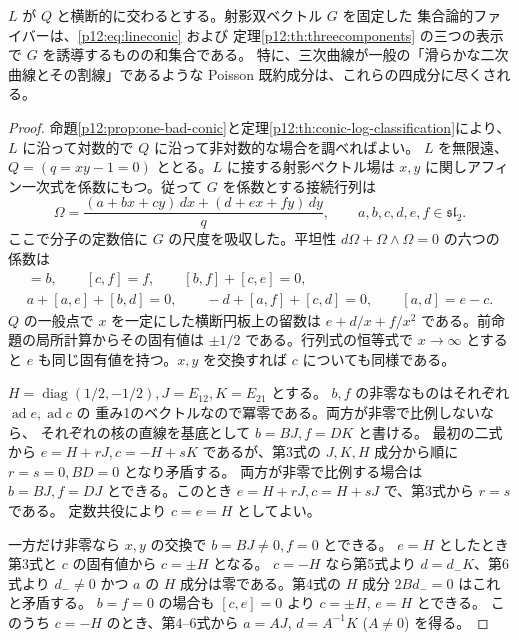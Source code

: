 \begin{theorem}\label{p12:th:secant-classification}
$L$ が $Q$ と横断的に交わるとする。射影双ベクトル $G$ を固定した
集合論的ファイバーは、\eqref{p12:eq:lineconic} および
定理\ref{p12:th:threecomponents} の三つの表示で $G$ を誘導するものの和集合である。
特に、三次曲線が一般の「滑らかな二次曲線とその割線」であるような
Poisson 既約成分は、これらの四成分に尽くされる。
\end{theorem}
\begin{proof}
命題\ref{p12:prop:one-bad-conic}と定理\ref{p12:th:conic-log-classification}により、
$L$ に沿って対数的で $Q$ に沿って非対数的な場合を調べればよい。
$L$ を無限遠、$Q=(q=xy-1=0)$ ととる。$L$ に接する射影ベクトル場は
$x,y$ に関しアフィン一次式を係数にもつ。従って $G$ を係数とする接続行列は
\[
 \Omega=\frac{(a+bx+cy)\,dx+(d+ex+fy)\,dy}{q},
 \qquad a,b,c,d,e,f\in\mathfrak{sl}_2.
\]
ここで分子の定数倍に $G$ の尺度を吸収した。平坦性
$d\Omega+\Omega\wedge\Omega=0$ の六つの係数は
\begin{align*}
 [e,b]=b,\qquad [c,f]=f,\qquad [b,f]+[c,e]=0,\\
 a+[a,e]+[b,d]=0,\qquad -d+[a,f]+[c,d]=0,\qquad [a,d]=e-c .
\end{align*}
$Q$ の一般点で $x$ を一定にした横断円板上の留数は
$e+d/x+f/x^2$ である。前命題の局所計算からその固有値は
$\pm1/2$ である。行列式の恒等式で $x\to\infty$ とすると
$e$ も同じ固有値を持つ。$x,y$ を交換すれば $c$ についても同様である。

$H=\operatorname{diag}(1/2,-1/2), J=E_{12}, K=E_{21}$ とする。
$b,f$ の非零なものはそれぞれ $\operatorname{ad}e,\operatorname{ad}c$ の
重み1のベクトルなので冪零である。両方が非零で比例しないなら、
それぞれの核の直線を基底として $b=BJ,f=DK$ と書ける。
最初の二式から $e=H+rJ,c=-H+sK$ であるが、第3式の
$J,K,H$ 成分から順に $r=s=0,BD=0$ となり矛盾する。
両方が非零で比例する場合は $b=BJ,f=DJ$ とできる。このとき
$e=H+rJ,c=H+sJ$ で、第3式から $r=s$ である。
定数共役により $c=e=H$ としてよい。

一方だけ非零なら $x,y$ の交換で $b=BJ\ne0,f=0$ とできる。
$e=H$ としたとき第3式と $c$ の固有値から $c=\pm H$ となる。
$c=-H$ なら第5式より $d=d_-K$、第6式より $d_-\ne0$ かつ
$a$ の $H$ 成分は零である。第4式の $H$ 成分 $2Bd_-=0$ はこれと矛盾する。
$b=f=0$ の場合も $[c,e]=0$ より $c=\pm H$, $e=H$ とできる。
このうち $c=-H$ のとき、第4--6式から
$a=AJ$, $d=A^{-1}K$ ($A\ne0$) を得る。


\end{proof}
